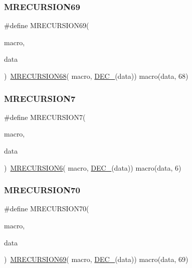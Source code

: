 \subsubsection{\texorpdfstring{MRECURSION69}{MRECURSION69}}
{\footnotesize\ttfamily \#define M\+R\+E\+C\+U\+R\+S\+I\+O\+N69(\begin{DoxyParamCaption}\item[{}]{macro,  }\item[{}]{data }\end{DoxyParamCaption})~\mbox{\hyperlink{group__group__sam0__utils__mrecursion_gaa350567fcc5f153cda9d1cfcff214a99}{M\+R\+E\+C\+U\+R\+S\+I\+O\+N68}}(  macro, \mbox{\hyperlink{group__group__sam0__utils__mrecursion_ga1d23d683797679dca8c3512a54a5dcae}{D\+E\+C\+\_\+}}(data))   macro(data, 68)}

\mbox{\label{group__group__sam0__utils__mrecursion_ga995e80fc9e504c74b860f862ab3cc474}} 
\subsubsection{\texorpdfstring{MRECURSION7}{MRECURSION7}}
{\footnotesize\ttfamily \#define M\+R\+E\+C\+U\+R\+S\+I\+O\+N7(\begin{DoxyParamCaption}\item[{}]{macro,  }\item[{}]{data }\end{DoxyParamCaption})~\mbox{\hyperlink{group__group__sam0__utils__mrecursion_gaf21e043eaf3be7f96acaad10d42798f6}{M\+R\+E\+C\+U\+R\+S\+I\+O\+N6}}(  macro, \mbox{\hyperlink{group__group__sam0__utils__mrecursion_ga1d23d683797679dca8c3512a54a5dcae}{D\+E\+C\+\_\+}}(data))   macro(data, 6)}

\mbox{\label{group__group__sam0__utils__mrecursion_gaf4c046319eba8a2f6684263fb690ad64}} 
\subsubsection{\texorpdfstring{MRECURSION70}{MRECURSION70}}
{\footnotesize\ttfamily \#define M\+R\+E\+C\+U\+R\+S\+I\+O\+N70(\begin{DoxyParamCaption}\item[{}]{macro,  }\item[{}]{data }\end{DoxyParamCaption})~\mbox{\hyperlink{group__group__sam0__utils__mrecursion_ga0298145e1a282f5e0264927f7d41f8d3}{M\+R\+E\+C\+U\+R\+S\+I\+O\+N69}}(  macro, \mbox{\hyperlink{group__group__sam0__utils__mrecursion_ga1d23d683797679dca8c3512a54a5dcae}{D\+E\+C\+\_\+}}(data))   macro(data, 69)}

